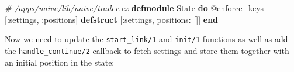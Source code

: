 \documentclass[
  oneside]{book}
\newenvironment{Shaded}{\begin{snugshade}}{\end{snugshade}}
\newcommand{\CommentTok}[1]{\textcolor[rgb]{0.56,0.35,0.01}{\textit{#1}}}
\newcommand{\ConstantTok}[1]{\textcolor[rgb]{0.56,0.35,0.01}{#1}}
\newcommand{\KeywordTok}[1]{\textcolor[rgb]{0.13,0.29,0.53}{\textbf{#1}}}
\newcommand{\NormalTok}[1]{#1}
\newcommand{\OtherTok}[1]{\textcolor[rgb]{0.56,0.35,0.01}{#1}}
\newcommand{\VariableTok}[1]{\textcolor[rgb]{0.00,0.00,0.00}{#1}}
\begin{document}
\begin{Shaded}
\begin{Highlighting}[]
  \CommentTok{\# /apps/naive/lib/naive/trader.ex}
  \KeywordTok{defmodule} \ConstantTok{State} \KeywordTok{do}
    \OtherTok{@enforce\_keys} \OtherTok{[}\VariableTok{:settings}\NormalTok{, }\VariableTok{:positions}\OtherTok{]}
    \KeywordTok{defstruct} \OtherTok{[}\VariableTok{:settings}\NormalTok{, }\VariableTok{positions:} \OtherTok{[]]}
  \KeywordTok{end}
\end{Highlighting}
\end{Shaded}

Now we need to update the \texttt{start\_link/1} and \texttt{init/1} functions as well as add the \texttt{handle\_continue/2} callback to fetch settings and store them together with an initial position in the state:
\end{document}
